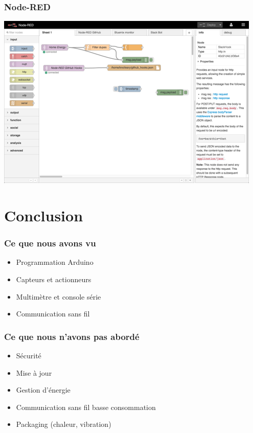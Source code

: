 \documentclass[aspectratio=169,utf8,french]{beamer}
\begin{document}
\begin{frame}
  \frametitle{Node-RED}
  \begin{center}
    \includegraphics[height=.8\textheight]{pictures/nodered.png}
  \end{center}
\end{frame}


\section{Conclusion}

\begin{frame}
  \frametitle{Ce que nous avons vu}
  \begin{itemize}
    \item Programmation Arduino
    \item Capteurs et actionneurs
    \item Multimètre et console série
    \item Communication sans fil
  \end{itemize}
\end{frame}

\begin{frame}
  \frametitle{Ce que nous n’avons pas abordé}
  \begin{itemize}
    \item Sécurité
    \item Mise à jour
    \item Gestion d'énergie
    \item Communication sans fil basse consommation
    \item Packaging (chaleur, vibration)
  \end{itemize}
\end{frame}
\end{document}
